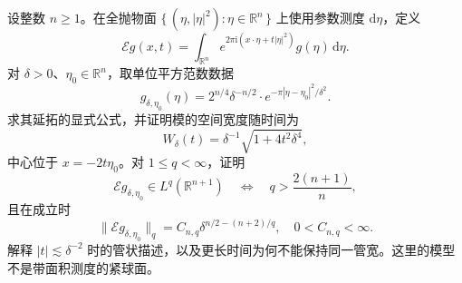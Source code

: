 \begin{optionalexercise}\label{b2:ex:23-new-8}
设整数 \(n\geq1\)。在全抛物面 \(\{\,(\eta,|\eta|^2):\eta\in\mathbb R^n\,\}\) 上使用参数测度 \(\mathrm d\eta\)，定义
\[
 \mathcal Eg(x,t)=\int_{\mathbb R^n}
          e^{2\pi\mathrm i(x\cdot\eta+t|\eta|^2)}g(\eta)\,\mathrm d\eta.
\]
对 \(\delta>0\)、\(\eta_0\in\mathbb R^n\)，取单位平方范数数据
\[
 g_{\delta,\eta_0}(\eta)=2^{n/4}\delta^{-n/2}
              \cdot e^{-\pi|\eta-\eta_0|^2/\delta^2}.
\]
求其延拓的显式公式，并证明模的空间宽度随时间为
\[
 W_\delta(t)=\delta^{-1}\sqrt{1+4t^2\delta^4},
\]
中心位于 \(x=-2t\eta_0\)。对 \(1\leq q<\infty\)，证明
\[
 \mathcal Eg_{\delta,\eta_0}\in L^q(\mathbb R^{n+1})
 \quad\Longleftrightarrow\quad q>\frac{2(n+1)}n,
\]
且在成立时
\[
 \|\mathcal Eg_{\delta,\eta_0}\|_q
 =C_{n,q}\delta^{n/2-(n+2)/q},\quad0<C_{n,q}<\infty.
\]
解释 \(|t|\lesssim\delta^{-2}\) 时的管状描述，以及更长时间为何不能保持同一管宽。这里的模型不是带面积测度的紧球面。
\end{optionalexercise}
